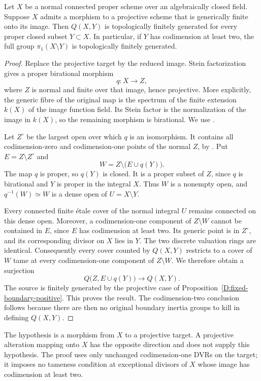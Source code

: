 \begin{proposition}
\label{D:generically-finite-projective-target}
Let $X$ be a normal connected proper scheme over an
algebraically closed field.  Suppose $X$ admits a morphism
to a projective scheme that is generically finite onto its
image.  Then $Q(X,Y)$ is topologically finitely generated
for every proper closed subset $Y\subset X$.
In particular, if $Y$ has codimension at least two, the
full group $\pi_1(X\setminus Y)$ is topologically finitely
generated.
\end{proposition}
\begin{proof}
Replace the projective target by the reduced image.
Stein factorization gives a proper birational morphism
\[
                              q:X\longrightarrow Z,
\]
where $Z$ is normal and finite over that image, hence
projective.  More explicitly, the generic fibre of the
original map is the spectrum of the finite extension
$k(X)$ of the image function field.  Its Stein factor
is the normalization of the image in $k(X)$, so the
remaining morphism is birational.  We use
\cite[Theorem 37.53.4, tag 03H0]{C_StacksFibration}.

Let $Z^\circ$ be the largest open over which $q$ is an
isomorphism.  It contains all codimension-zero and
codimension-one points of the normal $Z$, by
\cite[Lemma 33.17.3, tag 0BFP]{C_StacksProjectiveTarget}.
Put $E=Z\setminus Z^\circ$ and
\[
                  W=Z\setminus\bigl(E\cup q(Y)\bigr).
\]
The map $q$ is proper, so $q(Y)$ is closed.  It is a proper
subset of $Z$, since $q$ is birational and $Y$ is proper
in the integral $X$.  Thus $W$ is a nonempty open, and
$q^{-1}(W)\simeq W$ is a dense open of $U=X\setminus Y$.

Every connected finite \'etale cover of the normal
integral $U$ remains connected on this dense open.
Moreover, a codimension-one component of
$Z\setminus W$ cannot be contained in $E$, since $E$
has codimension at least two.  Its generic point is in
$Z^\circ$, and its corresponding divisor on $X$ lies
in $Y$.  The two discrete valuation rings are identical.
Consequently every cover counted by $Q(X,Y)$ restricts
to a cover of $W$ tame at every codimension-one component
of $Z\setminus W$.  We therefore obtain a surjection
\[
                 Q\bigl(Z,E\cup q(Y)\bigr)
                         \longrightarrow Q(X,Y).
\]
The source is finitely generated by the projective case
of Proposition~\ref{D:fixed-boundary-positive}.  This
proves the result.  The codimension-two conclusion follows
because there are then no original boundary inertia groups
to kill in defining $Q(X,Y)$.
\end{proof}

\begin{remark}
The hypothesis is a morphism from $X$ to a projective target.
A projective alteration mapping onto $X$ has the opposite
direction and does not supply this hypothesis.  The proof
uses only unchanged codimension-one DVRs on the target;
it imposes no tameness condition at exceptional divisors
of $X$ whose image has codimension at least two.
\end{remark}
